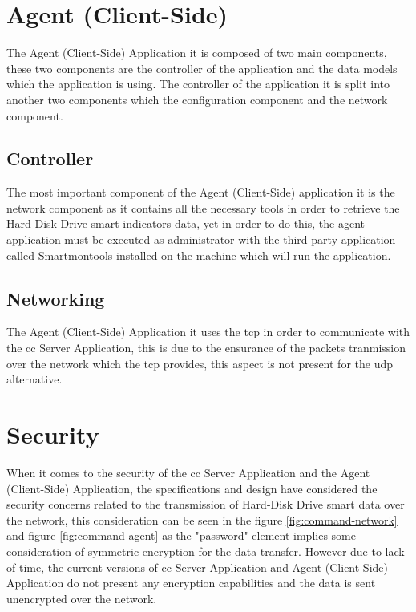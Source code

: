 \newpage

\section{Agent (Client-Side)}

The Agent (Client-Side) Application it is composed of two main components, these two components
are the controller of the application and the data models which the application is using.
The controller of the application it is split into another two components which the configuration
component and the network component.

\subsection{Controller}

The most important component of the Agent (Client-Side)
application it is the network component as it contains all the necessary tools in order to
retrieve the Hard-Disk Drive \acrfull{smart} indicators data, yet in order to do this, the
agent application must be executed as administrator with the third-party application called
Smartmontools installed on the machine which will run the application.

\subsection{Networking}

The Agent (Client-Side) Application it uses the \acrfull{tcp} in order to communicate with the \acrfull{cc} Server
Application, this is due to the ensurance of the packets tranmission over the network which the \acrfull{tcp}
provides, this aspect is not present for the \acrfull{udp} alternative.

\section{Security}

When it comes to the security of the \acrfull{cc} Server Application and the Agent (Client-Side) Application,
the specifications and design have considered the security concerns related to the transmission of Hard-Disk Drive
\acrfull{smart} data over the network, this consideration can be seen in the figure \ref{fig:command-network}
and figure \ref{fig:command-agent} as the "password" element implies some consideration of symmetric encryption
for the data transfer. However due to lack of time, the current versions of \acrfull{cc} Server Application and
Agent (Client-Side) Application do not present any encryption capabilities and the data is sent unencrypted over
the network.

